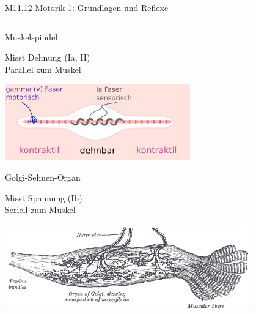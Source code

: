 \documentclass{beamer}
\begin{document}




\begin{frame}{M11.12 Motorik 1: Grundlagen und Reflexe} 


\begin{columns}[c]

\begin{column}{5cm}
\begin{block}{Muskelspindel}


Misst Dehnung (Ia, II) \\
Parallel zum Muskel \\

\begin{center}
    \includegraphics[width=\textwidth]{MuscleSpindle.png}
\end{center}

\end{block}

\begin{block}{Golgi-Sehnen-Organ}

Misst Spannung (Ib)\\
Seriell zum Muskel


\begin{center}
    \includegraphics[width=0.8\textwidth]{Gray938.png}
\end{center}



\end{block}
\end{column}
\end{columns}
\end{frame}
\end{document}

